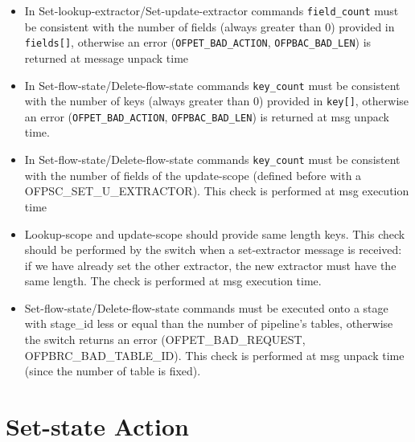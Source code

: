 \begin{itemize}
\item In Set-lookup-extractor/Set-update-extractor commands \texttt{field\_count} must be consistent with the number of fields (always greater than 0) provided in \texttt{fields[]}, otherwise an error (\texttt{OFPET\_BAD\_ACTION}, \texttt{OFPBAC\_BAD\_LEN}) is returned at message unpack time

\item In Set-flow-state/Delete-flow-state commands \texttt{key\_count} must be consistent with the number of keys (always greater than 0) provided in \texttt{key[]}, otherwise an error (\texttt{OFPET\_BAD\_ACTION}, \texttt{OFPBAC\_BAD\_LEN}) is returned at msg unpack time. 

\item In Set-flow-state/Delete-flow-state commands \texttt{key\_count} must be consistent with the number of fields of the update-scope (defined before with a OFPSC\_SET\_U\_EXTRACTOR). This check is performed at msg execution time

\item Lookup-scope and update-scope should provide same length keys. This check should be performed by the switch when a set-extractor message is received: if we have already set the other extractor, the new extractor must have the same length. The check is performed at msg execution time.

\item Set-flow-state/Delete-flow-state commands must be executed onto a stage with stage\_id less or equal than the number of pipeline’s tables, otherwise the switch returns an error (OFPET\_BAD\_REQUEST, OFPBRC\_BAD\_TABLE\_ID). This check is performed at msg unpack time (since the number of table is fixed).

\end{itemize}

\section{Set-state Action}
\label{sec:act_set_state}

